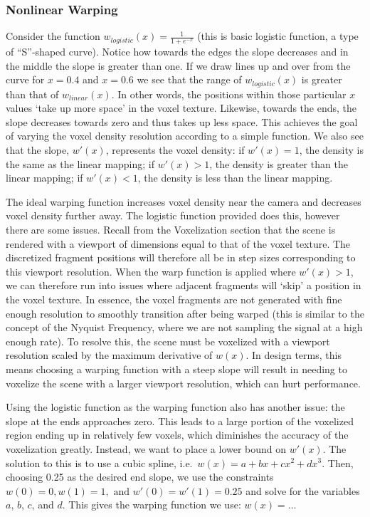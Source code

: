\subsubsection{Nonlinear Warping}
Consider the function $w_{logistic}(x) = \frac{1}{1 + e^{-x}}$ (this is basic logistic function, a type of ``S''-shaped curve). Notice how towards the edges the slope decreases and in the middle the slope is greater than one. If we draw lines up and over from the curve for $x = 0.4$ and $x = 0.6$ we see that the range of $w_{logistic}(x)$ is greater than that of $w_{linear}(x)$. In other words, the positions within those particular $x$ values `take up more space' in the voxel texture. Likewise, towards the ends, the slope decreases towards zero and thus takes up less space. This achieves the goal of varying the voxel density resolution according to a simple function. We also see that the slope, $w'(x)$, represents the voxel density: if $w'(x) = 1$, the density is the same as the linear mapping; if $w'(x) > 1$, the density is greater than the linear mapping; if $w'(x) < 1$, the density is less than the linear mapping.

The ideal warping function increases voxel density near the camera and decreases voxel density further away. The logistic function provided does this, however there are some issues. Recall from the Voxelization section that the scene is rendered with a viewport of dimensions equal to that of the voxel texture. The discretized fragment positions will therefore all be in step sizes corresponding to this viewport resolution. When the warp function is applied where $w'(x) > 1$, we can therefore run into issues where adjacent fragments will `skip' a position in the voxel texture. In essence, the voxel fragments are not generated with fine enough resolution to smoothly transition after being warped (this is similar to the concept of the Nyquist Frequency, where we are not sampling the signal at a high enough rate). To resolve this, the scene must be voxelized with a viewport resolution scaled by the maximum derivative of $w(x)$. In design terms, this means choosing a warping function with a steep slope will result in needing to voxelize the scene with a larger viewport resolution, which can hurt performance. %

Using the logistic function as the warping function also has another issue: the slope at the ends approaches zero. This leads to a large portion of the voxelized region ending up in relatively few voxels, which diminishes the accuracy of the voxelization greatly. %
Instead, we want to place a lower bound on $w'(x)$. The solution to this is to use a cubic spline, i.e.\ $w(x) = a + bx + cx^2 + dx^3$. Then, choosing 0.25 as the desired end slope, we use the constraints $w(0) = 0, w(1) = 1, \text{ and } w'(0) = w'(1) = 0.25$ and solve for the variables $a$, $b$, $c$, and $d$. This gives the warping function we use: $w(x) = \ldots$ %

